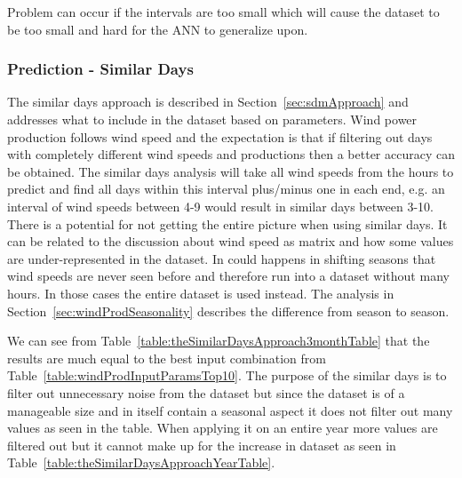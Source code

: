 Problem can occur if the intervals are too small which will cause the dataset to be too small and hard for the ANN to generalize upon.

\subsubsection{Prediction - Similar Days}
The similar days approach is described in Section~\ref{sec:sdmApproach} and addresses what to include in the dataset based on parameters. Wind power production follows wind speed and the expectation is that if filtering out days with completely different wind speeds and productions then a better accuracy can be obtained. The similar days analysis will take all wind speeds from the hours to predict and find all days within this interval plus/minus one in each end, e.g. an interval of wind speeds between 4-9 would result in similar days between 3-10. There is a potential for not getting the entire picture when using similar days. It can be related to the discussion about wind speed as matrix and how some values are under-represented in the dataset. In could happens in shifting seasons that wind speeds are never seen before and therefore run into a dataset without many hours. In those cases the entire dataset is used instead. The analysis in Section~\ref{sec:windProdSeasonality} describes the difference from season to season.

We can see from Table~\ref{table:theSimilarDaysApproach3monthTable} that the results are much equal to the best input combination from Table~\ref{table:windProdInputParamsTop10}. The purpose of the similar days is to filter out unnecessary noise from the dataset but since the dataset is of a manageable size and in itself contain a seasonal aspect it does not filter out many values as seen in the table. When applying it on an entire year more values are filtered out but it cannot make up for the increase in dataset as seen in Table~\ref{table:theSimilarDaysApproachYearTable}.

